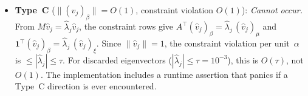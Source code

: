 \begin{unverified}
\begin{remark}
\begin{itemize}
\item \textbf{Type~C} ($\|(\hat v_j)_\beta\| = O(1)$,
  constraint violation $O(1)$):
  \emph{Cannot occur.}
  From $M\hat v_j = \hat\lambda_j \hat v_j$,
  the constraint rows give
  $A^\top (\hat v_j)_\beta = \hat\lambda_j\, (\hat v_j)_\mu$
  and
  $\mathbf{1}^\top (\hat v_j)_\beta = \hat\lambda_j\, (\hat v_j)_\xi$.
  Since $\|\hat v_j\| = 1$,
  the constraint violation per unit~$\alpha$ is
  $\leq |\hat\lambda_j| \leq \tau$.
  For discarded eigenvectors ($|\hat\lambda_j| \leq \tau = 10^{-3}$),
  this is $O(\tau)$, not $O(1)$.
  The implementation includes a runtime assertion that panics
  if a Type~C direction is ever encountered.
\end{itemize}
\end{remark}
\end{unverified}

